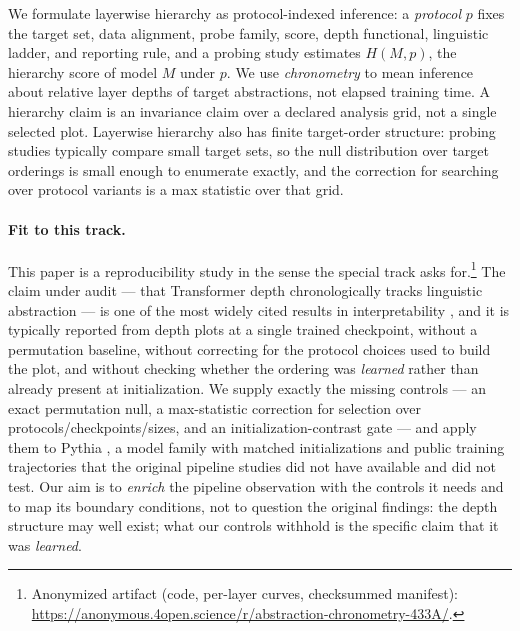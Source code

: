 \documentclass[11pt]{article}
\begin{document}
We formulate layerwise hierarchy as protocol-indexed inference: a \emph{protocol} $p$ fixes the target set, data alignment, probe family, score, depth functional, linguistic ladder, and reporting rule, and a probing study estimates $H(M,p)$, the hierarchy score of model $M$ under $p$. We use \emph{chronometry} to mean inference about relative layer depths of target abstractions, not elapsed training time. A hierarchy claim is an invariance claim over a declared analysis grid, not a single selected plot. Layerwise hierarchy also has finite target-order structure: probing studies typically compare small target sets, so the null distribution over target orderings is small enough to enumerate exactly, and the correction for searching over protocol variants is a max statistic over that grid.

\paragraph{Fit to this track.} This paper is a reproducibility study in the sense the special track asks for.\footnote{Anonymized artifact (code, per-layer curves, checksummed manifest): \url{https://anonymous.4open.science/r/abstraction-chronometry-433A/}.} The claim under audit --- that Transformer depth chronologically tracks linguistic abstraction --- is one of the most widely cited results in interpretability \citep{tenney2019bert,jawahar2019bert,rogers2020primer}, and it is typically reported from depth plots at a single trained checkpoint, without a permutation baseline, without correcting for the protocol choices used to build the plot, and without checking whether the ordering was \emph{learned} rather than already present at initialization. We supply exactly the missing controls --- an exact permutation null, a max-statistic correction for selection over protocols/checkpoints/sizes, and an initialization-contrast gate --- and apply them to Pythia \citep{biderman2023pythia}, a model family with matched initializations and public training trajectories that the original pipeline studies did not have available and did not test. Our aim is to \emph{enrich} the pipeline observation with the controls it needs and to map its boundary conditions, not to question the original findings: the depth structure may well exist; what our controls withhold is the specific claim that it was \emph{learned}.
\end{document}
